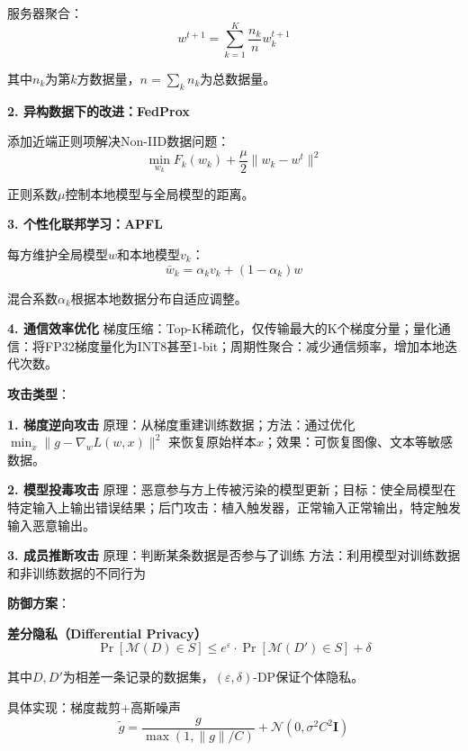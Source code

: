 服务器聚合：
\begin{equation}
w^{t+1} = \sum_{k=1}^{K} \frac{n_k}{n} w_k^{t+1}
\end{equation}

其中$n_k$为第$k$方数据量，$n=\sum_k n_k$为总数据量。

\textbf{2. 异构数据下的改进：FedProx}

添加近端正则项解决Non-IID数据问题：
\begin{equation}
\min_{w_k} F_k(w_k) + \frac{\mu}{2} \|w_k - w^t\|^2
\end{equation}

正则系数$\mu$控制本地模型与全局模型的距离。

\textbf{3. 个性化联邦学习：APFL}

每方维护全局模型$w$和本地模型$v_k$：
\begin{equation}
\bar{w}_k = \alpha_k v_k + (1-\alpha_k) w
\end{equation}

混合系数$\alpha_k$根据本地数据分布自适应调整。

\textbf{4. 通信效率优化}
梯度压缩：Top-K稀疏化，仅传输最大的K个梯度分量；量化通信：将FP32梯度量化为INT8甚至1-bit；周期性聚合：减少通信频率，增加本地迭代次数。

\textbf{攻击类型}：

\textbf{1. 梯度逆向攻击}
原理：从梯度重建训练数据；方法：通过优化 $\min_x \|g - \nabla_w L(w, x)\|^2$ 来恢复原始样本$x$；效果：可恢复图像、文本等敏感数据。

\textbf{2. 模型投毒攻击}
原理：恶意参与方上传被污染的模型更新；目标：使全局模型在特定输入上输出错误结果；后门攻击：植入触发器，正常输入正常输出，特定触发输入恶意输出。

\textbf{3. 成员推断攻击}
原理：判断某条数据是否参与了训练 方法：利用模型对训练数据和非训练数据的不同行为

\textbf{防御方案}：

\textbf{差分隐私（Differential Privacy）}
\begin{equation}
\Pr[\mathcal{M}(D) \in S] \leq e^\varepsilon \cdot \Pr[\mathcal{M}(D') \in S] + \delta
\end{equation}

其中$D, D'$为相差一条记录的数据集，$(\varepsilon, \delta)$-DP保证个体隐私。

具体实现：梯度裁剪+高斯噪声
\begin{equation}
\tilde{g} = \frac{g}{\max(1, \|g\|/C)} + \mathcal{N}(0, \sigma^2 C^2 \mathbf{I})
\end{equation}


